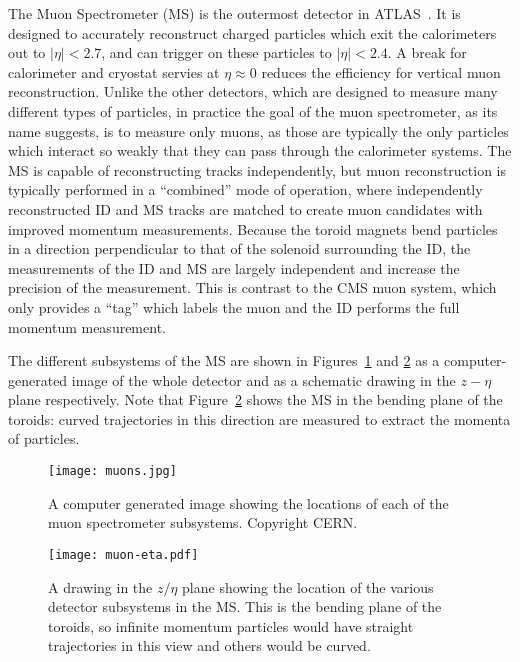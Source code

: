 The Muon Spectrometer (MS) is the outermost detector in ATLAS~\cite{ATLASPaper,ATLASMS}. It is designed to accurately reconstruct charged particles which exit the calorimeters out to $|\eta| < 2.7$, and can trigger on these particles to $|\eta| < 2.4$. A break for calorimeter and cryostat servies at $\eta \approx 0$ reduces the efficiency for vertical muon reconstruction.  Unlike the other detectors, which are designed to measure many different types of particles, in practice the goal of the muon spectrometer, as its name suggests, is to measure only muons, as those are typically the only particles which interact so weakly that they can pass through the calorimeter systems. The MS is capable of reconstructing tracks independently, but muon reconstruction is typically performed in a ``combined'' mode of operation, where independently reconstructed ID and MS tracks are matched to create muon candidates with improved momentum measurements. Because the toroid magnets bend particles in a direction perpendicular to that of the solenoid surrounding the ID, the measurements of the ID and MS are largely independent and increase the precision of the measurement. This is contrast to the CMS muon system, which only provides a ``tag'' which labels the muon and the ID performs the full momentum measurement.

The different subsystems of the MS are shown in Figures~\ref{fig:detector:ms} and \ref{fig:detector:ms-eta} as a computer-generated image of the whole detector and as a schematic drawing in the $z-\eta$ plane respectively. Note that Figure~\ref{fig:detector:ms-eta} shows the MS in the bending plane of the toroids: curved trajectories in this direction are measured to extract the momenta of particles. 



\begin{figure}
\centering
\texttt{[image: muons.jpg]}
\caption{A computer generated image showing the locations of each of the muon spectrometer subsystems. Copyright CERN.}
\label{fig:detector:ms}
\end{figure}



\begin{figure}
\centering
\texttt{[image: muon-eta.pdf]}
\caption{A drawing in the $z/\eta$ plane showing the location of the various detector subsystems in the MS. This is the bending plane of the toroids, so infinite momentum particles would have straight trajectories in this view and others would be curved.}
\label{fig:detector:ms-eta}
\end{figure}

